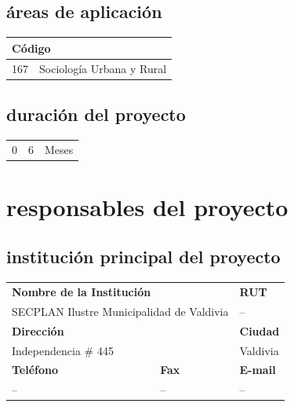 \documentclass[12pt]{article}
\begin{document}
\subsection{áreas de aplicación}
\begin{table}[!h]
	\begin{tabular}{|p{2cm}|p{12.55cm}|}
        \multicolumn{2}{l}{Código} \\
        \hline
        167 & Sociología Urbana y Rural \\ \hline
	\end{tabular}
\end{table}

\subsection{duración del proyecto}
\begin{table}[!h]
	\begin{tabular}{|p{1cm}|p{1cm}|l}
        \cline{1-2}
        \cellcolor{lightgray} 0 & \cellcolor{lightgray} 6 & Meses \\
        \cline{1-2}
    \end{tabular}
\end{table}

\newpage
\section{responsables del proyecto}
\subsection{institución principal del proyecto}
\begin{table}[!h]
	\centering
        \begin{tabular}{|p{4.7cm}|p{4.7cm}|p{4.8cm}|}
        \hline
        \multicolumn{2}{|l|}{\textbf{Nombre de la Institución}} &
        \textbf{RUT} \\
        \multicolumn{2}{|l|}{SECPLAN Ilustre Municipalidad de Valdivia}
        & -- \\ \hline
        \multicolumn{2}{|l|}{\textbf{Dirección}} & \textbf{Ciudad} \\
        \multicolumn{2}{|l|}{Independencia \# 445} & Valdivia \\ \hline
        \textbf{Teléfono} & \textbf{Fax} & \textbf{E-mail} \\
        -- & -- & -- \\ \hline
	\end{tabular}
\end{table}
\end{document}
